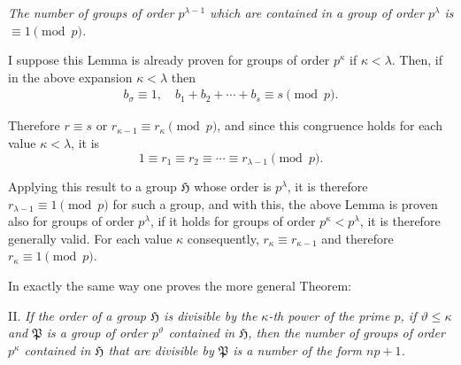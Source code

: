 \documentclass[a5paper,12pt]{article}
\newcommand{\secformat}[1]{\centering{\normalfont\normalsize{#1}}}
\let\fr\mathfrak
\newcommand{\CH}{\fr{H}}
\newcommand{\CP}{\fr{P}}
\newcommand{\?}{{\color{blue}${}^{(?)}$}}
\begin{document}

\emph{The number of groups of order $p^{\lambda-1}$
which are contained in a group of order $p^\lambda$
is $\equiv 1 \pmod{p}$.}


I suppose this Lemma is already proven
for groups of order $p^\kappa$ if $\kappa < \lambda$.
%
%
Then,
if in the above expansion $\kappa < \lambda$
then
\begin{align} \label{e:4-6} \tag{6.}
	b_\sigma \equiv 1,
	\quad
	b_1 + b_2 + \cdots + b_s \equiv s
	\pmod{p}.
\end{align}


Therefore $r \equiv s$ or $r_{\kappa-1} \equiv r_\kappa \pmod{p}$,
and since this congruence
holds for each value $\kappa < \lambda$,
it is
\[
	1 \equiv r_1 \equiv r_2 \equiv \cdots \equiv r_{\lambda-1}
	\pmod{p}
	.
\]


Applying this result 
to a group $\CH$
whose order is $p^\lambda$,
it is therefore
$r_{\lambda-1} \equiv 1 \pmod{p}$
for such a group,
and
with this,
the above Lemma is proven
also for groups of order $p^\lambda$,
if it holds
for groups of order $p^\kappa < p^\lambda$,
it is therefore generally valid.
%
%
For each value $\kappa$
consequently,
$r_\kappa \equiv r_{\kappa-1}$
and
therefore
$r_\kappa \equiv 1 \pmod{p}$.


In exactly the same way
one proves the more general Theorem:


II.
%
\label{t:4-2}
%
\emph{ %
If the order of a group $\CH$
is divisible by the $\kappa$-th power
of the prime $p$,
if $\vartheta \leq \kappa$
and
$\CP$ is a group of order $p^\vartheta$
contained in $\CH$,
then
the number of groups of order $p^\kappa$
contained in $\CH$
that are divisible by $\CP$
is a number of the form $n p + 1$.
}



\subsubsection*{\secformat{\S.~5.}}
\end{document}
